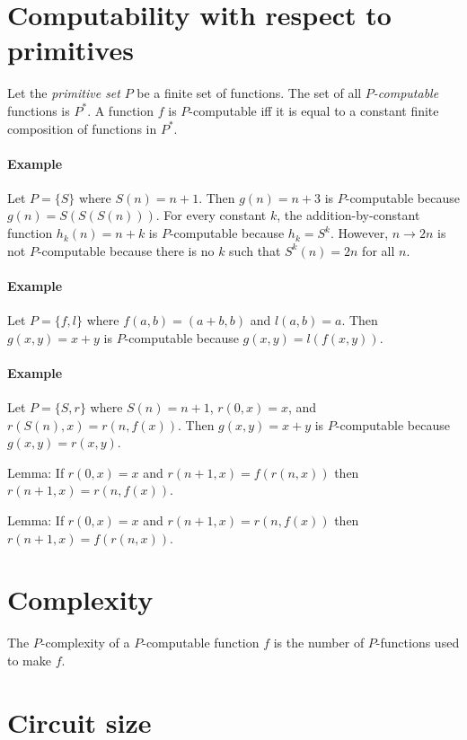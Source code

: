 \section{Computability with respect to primitives}

Let the \emph{primitive set} \(P\) be a finite set of functions.
The set of all \emph{\(P\)-computable} functions is \(P^*\).
A function \(f\) is \(P\)-computable iff it is equal to
a constant finite composition of functions in \(P^*\).

\paragraph{Example}
Let \(P = \{S\}\) where \(S(n) = n+1\).
Then \(g(n) = n + 3\) is \(P\)-computable because \(g(n) = S(S(S(n)))\).
For every constant \(k\), the addition-by-constant function \(h_k(n) = n+k\) is \(P\)-computable because \(h_k = S^k\).
However, \(n \to 2n\) is not \(P\)-computable
because there is no \(k\) such that \(S^k(n) = 2n\) for all \(n\).

\paragraph{Example}
Let \(P = \{f,l\}\) where \(f(a,b) = (a+b,b)\) and \(l(a,b) = a\).
Then \(g(x,y) = x+y\) is \(P\)-computable because \(g(x,y) = l(f(x,y))\).

\paragraph{Example}
Let \(P = \{S,r\}\) where \(S(n)=n+1\), \(r(0,x) = x\), and \(r(S(n),x) = r(n,f(x))\).
Then \(g(x,y) = x+y\) is \(P\)-computable because \(g(x,y) = r(x,y)\).

Lemma:
If \(r(0,x) = x\) and \(r(n+1,x) = f(r(n,x))\) then \(r(n+1,x) = r(n,f(x))\).

Lemma:
If \(r(0,x) = x\) and \(r(n+1,x) = r(n,f(x))\) then \(r(n+1,x) = f(r(n,x))\).

\section{Complexity}

The \(P\)-complexity of a \(P\)-computable function \(f\)
is the number of \(P\)-functions used to make \(f\).

\section{Circuit size}

